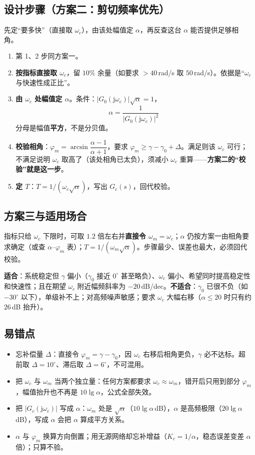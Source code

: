\subsection{设计步骤（方案二：剪切频率优先）}
先定“要多快”（直接取 $\omega_c$），由该处幅值定 $\alpha$，再反查这台 $\alpha$ 能否提供足够相角。
\begin{enumerate}
    \item 第 1、2 步同方案一。
    \item \textbf{按指标直接取 $\omega_c$}，留 $10\%$ 余量（如要求 $>40$\,rad/s 取 $50$\,rad/s）。依据是“$\omega_c$ 与快速性成正比”。
    \item \textbf{由 $\omega_c$ 处幅值定 $\alpha$}。条件：$|G_0(\mathrm{j}\omega_c)|\sqrt{\alpha}=1$，
    \[
    \alpha=\frac{1}{\bigl|G_0(\mathrm{j}\omega_c)\bigr|^{2}}
    \]
    分母是幅值\textbf{平方}，不是分贝值。
    \item \textbf{校验相角}：$\varphi_m=\arcsin\dfrac{\alpha-1}{\alpha+1}$，要求 $\varphi_m\ge\gamma-\gamma_0+\Delta$。满足则该 $\omega_c$ 可行；不满足说明 $\omega_c$ 取高了（该处相角已太负），须减小 $\omega_c$ 重算——\textbf{方案二的“校验”就是这一步}。
    \item \textbf{定 $T$}：$T=1/(\omega_c\sqrt{\alpha})$，写出 $G_c(s)$，回代校验。
\end{enumerate}

\subsection{方案三与适用场合}
指标只给 $\omega_c$ 下限时，可取 $1.2$ 倍左右并\textbf{直接令 $\omega_m=\omega_c$}；$\alpha$ 仍按方案一由相角要求确定（或查 $\alpha$--$\varphi_m$ 表）；$T=1/(\omega_m\sqrt{\alpha})$。步骤最少、误差也最大，必须回代校验。

\textbf{适合}：系统稳定但 $\gamma$ 偏小（$\gamma_0$ 接近 $0^\circ$ 甚至略负）、$\omega_c$ 偏小、希望同时提高稳定性和快速性；且在期望 $\omega_c$ 附近幅频斜率为 $-20$\,dB/dec。\textbf{不适合}：$\gamma_0$ 已很不负（如 $-30^\circ$ 以下），单级补不上；对高频噪声敏感；要求 $\omega_c$ 大幅右移（$\alpha\le20$ 时只有约 $26$\,dB 抬升）。

\subsection{易错点}
\begin{itemize}
    \item 忘补偿量 $\Delta$：直接令 $\varphi_m=\gamma-\gamma_0$，因 $\omega_c$ 右移后相角更负，$\gamma$ 必不达标。超前取 $\Delta=10^\circ$、滞后取 $\Delta=6^\circ$，不可混用。
    \item 把 $\omega_c$ 与 $\omega_m$ 当两个独立量：任何方案都要求 $\omega_c\approx\omega_m$，错开后只用到部分 $\varphi_m$，幅值抬升也不再是 $10\lg\alpha$，公式全部失效。
    \item 把 $|G_c(\mathrm{j}\omega_c)|$ 写成 $\alpha$：$\omega_m$ 处是 $\sqrt{\alpha}$（$10\lg\alpha$\,dB），$\alpha$ 是高频极限（$20\lg\alpha$\,dB），写成 $\alpha$ 会把 $\alpha$ 算成平方关系。
    \item $\alpha$ 与 $\varphi_m$ 换算方向倒置；用无源网络却忘补增益（$K_c=1/\alpha$，稳态误差变差 $\alpha$ 倍）；只算不验。
\end{itemize}

